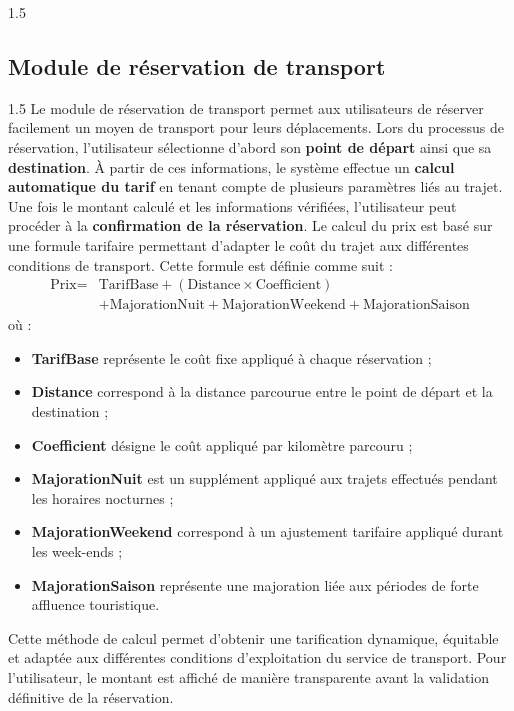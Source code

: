 \documentclass[a4paper,12pt]{report}
\begin{document}
\begin{spacing}{1.5}
\subsection{Module de réservation de transport}
\vspace{0.5cm}
\begin{spacing}{1.5}
\justifying
Le module de réservation de transport permet aux utilisateurs de réserver facilement un moyen de transport pour leurs déplacements. 
Lors du processus de réservation, l'utilisateur sélectionne d'abord son \textbf{point de départ} ainsi que sa \textbf{destination}. 
À partir de ces informations, le système effectue un \textbf{calcul automatique du tarif} en tenant compte de plusieurs paramètres liés au trajet. Une fois le montant calculé et les informations vérifiées, l'utilisateur peut procéder à la \textbf{confirmation de la réservation}.
Le calcul du prix est basé sur une formule tarifaire permettant d'adapter le coût du trajet aux différentes conditions de transport. Cette formule est définie comme suit :
\begin{equation}
\begin{aligned}
\text{Prix} = {}& \text{TarifBase} + (\text{Distance} \times \text{Coefficient}) \\
& + \text{MajorationNuit} + \text{MajorationWeekend} + \text{MajorationSaison}
\end{aligned}
\end{equation}
où :
\begin{itemize}
    \item \textbf{TarifBase} représente le coût fixe appliqué à chaque réservation ;
    \item \textbf{Distance} correspond à la distance parcourue entre le point de départ et la destination ;
    \item \textbf{Coefficient} désigne le coût appliqué par kilomètre parcouru ;
    \item \textbf{MajorationNuit} est un supplément appliqué aux trajets effectués pendant les horaires nocturnes ;
    \item \textbf{MajorationWeekend} correspond à un ajustement tarifaire appliqué durant les week-ends ;
    \item \textbf{MajorationSaison} représente une majoration liée aux périodes de forte affluence touristique.
\end{itemize}
Cette méthode de calcul permet d'obtenir une tarification dynamique, équitable et adaptée aux différentes conditions d'exploitation du service de transport. 
Pour l'utilisateur, le montant est affiché de manière transparente avant la validation définitive de la réservation.


\end{spacing}
\end{spacing}
\end{document}
